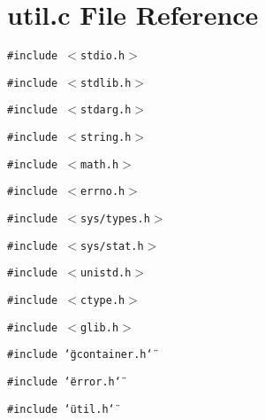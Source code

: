 \section{util.c File Reference}
\label{util_8c}
{\tt \#include $<$stdio.h$>$}\par
{\tt \#include $<$stdlib.h$>$}\par
{\tt \#include $<$stdarg.h$>$}\par
{\tt \#include $<$string.h$>$}\par
{\tt \#include $<$math.h$>$}\par
{\tt \#include $<$errno.h$>$}\par
{\tt \#include $<$sys/types.h$>$}\par
{\tt \#include $<$sys/stat.h$>$}\par
{\tt \#include $<$unistd.h$>$}\par
{\tt \#include $<$ctype.h$>$}\par
{\tt \#include $<$glib.h$>$}\par
{\tt \#include \char`\"{}gcontainer.h\char`\"{}}\par
{\tt \#include \char`\"{}error.h\char`\"{}}\par
{\tt \#include \char`\"{}util.h\char`\"{}}\par
